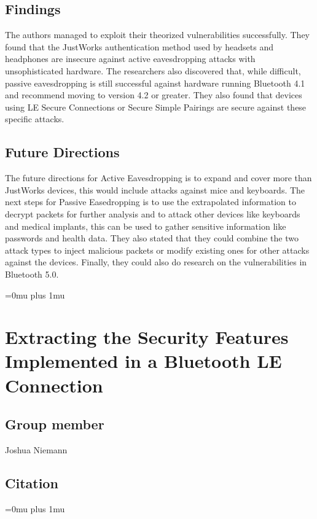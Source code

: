 \documentclass[letterpaper,12pt]{article}
\begin{document}
\subsection{Findings}

\noindent
The authors managed to exploit their theorized vulnerabilities successfully.  They found that the JustWorks authentication method used by headsets and headphones are insecure against active eavesdropping attacks with unsophisticated hardware.  The researchers also discovered that, while difficult, passive eavesdropping is still successful against hardware running Bluetooth 4.1 and recommend moving to version 4.2 or greater.  They also found that devices using LE Secure Connections or Secure Simple Pairings are secure against these specific attacks.

\subsection{Future Directions}

\noindent
The future directions for Active Eavesdropping is to expand and cover more than JustWorks devices, this would include attacks against mice and keyboards.  The next steps for Passive Easedropping is to use the extrapolated information to decrypt packets for further analysis and to attack other devices like keyboards and medical implants, this can be used to gather sensitive information like passwords and health data.  They also stated that they could combine the two attack types to inject malicious packets or modify existing ones for other attacks against the devices.  Finally, they could also do research on the vulnerabilities in Bluetooth 5.0.

\Urlmuskip=0mu plus 1mu\relax

\section{Extracting the Security Features Implemented in a Bluetooth LE Connection}


\noindent
\subsection{Group member}
Joshua Niemann
\subsection{Citation}

\Urlmuskip=0mu plus 1mu\relax
{}
\end{document}
